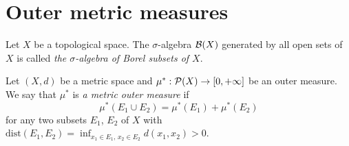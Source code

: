 \section{Outer metric measures}

\begin{definition}
Let $X$ be a topological space. The $\sigma$-algebra ${\mathcal B}(X)$ generated by all open sets of $X$ is called \textit{the $\sigma$-algebra of Borel subsets of $X$}.
\end{definition}

\begin{definition}
Let $(X,d)$ be a metric space and $\mu^*:{\mathcal P}(X)\rightarrow [0,+\infty]$ be an outer measure. We say that $\mu^*$ is \textit{a metric outer measure} if  
$$\mu^*(E_1\cup E_2)=\mu^*(E_1)+\mu^*(E_2)$$
for any two subsets $E_1$, $E_2$ of $X$ with $\mathrm{dist}(E_1,E_2)=\inf_{x_1\in E_1,\,x_2\in E_2}d(x_1,x_2)>0$.
\end{definition}

